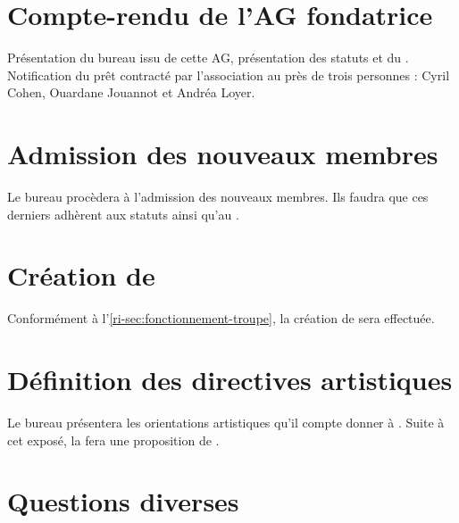 \section{Compte-rendu de l'AG fondatrice}
Présentation du bureau issu de cette AG, présentation des statuts et du \RI{}.
Notification du prêt contracté par l'association au près de trois personnes : Cyril Cohen, Ouardane Jouannot et Andréa Loyer.
\section{Admission des nouveaux membres}
Le bureau procèdera à l'admission des nouveaux membres. Ils faudra que ces derniers adhèrent aux statuts ainsi qu'au \RI{}.
\section{Création de \troupe{}}
Conformément à l'\ref{ri-sec:fonctionnement-troupe}, la création de \troupe{} sera effectuée.
\section{Définition des directives artistiques}
Le bureau présentera les orientations artistiques qu'il compte donner à \troupe{}. Suite à cet exposé, la \troupe{} fera une proposition de \DA{}.
\section{Questions diverses}

